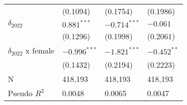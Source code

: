 \begin{tabular}{llll}
                           &           (0.1094) &           (0.1754) &           (0.1986) \\
$\delta_{2022}$            &      $0.881^{***}$ &     $-0.714^{***}$ &           $-0.061$ \\
                           &           (0.1296) &           (0.1998) &           (0.2061) \\
$\delta_{2022}$ x female   &     $-0.996^{***}$ &     $-1.821^{***}$ &      $-0.452^{**}$ \\
                           &           (0.1432) &           (0.2194) &           (0.2223) \\
N                          &            418,193 &            418,193 &            418,193 \\
Pseudo $R^2$               &             0.0048 &             0.0065 &             0.0047 \\
\bottomrule
\end{tabular}

